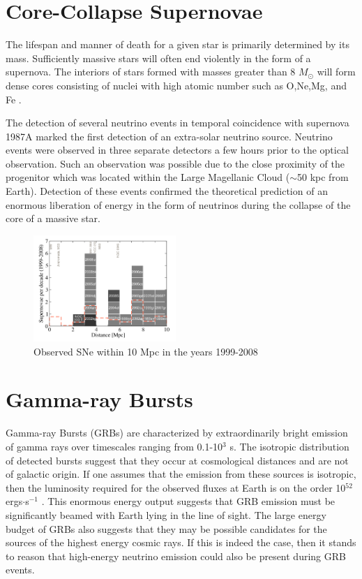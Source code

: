 \documentclass{gatech-thesis}
\begin{document}
\section{Core-Collapse Supernovae}
The lifespan and manner of death for a given star is primarily determined by its mass. Sufficiently massive stars will often end violently in the form of a supernova. The interiors of stars formed with masses greater than 8 $M_{\odot}$ will form dense cores consisting of nuclei with high atomic number such as O,Ne,Mg, and Fe \cite{2003astro.ph..1006H}.

The detection of several neutrino events in temporal coincidence with supernova 1987A marked the first detection of an extra-solar neutrino source. Neutrino events were observed in three separate detectors a few hours prior to the optical observation. Such an observation was possible due to the close proximity of the progenitor which was located within the Large Magellanic Cloud ($\sim$50 kpc from Earth). Detection of these events confirmed the theoretical prediction of an enormous liberation of energy in the form of neutrinos during the collapse of the core of a massive star.


\begin{figure}
  \begin{center}
    \includegraphics[width=0.48\textwidth,keepaspectratio]{NearbySNCatalogue.png}
  \end{center}
  \caption{Observed SNe within 10 Mpc in the years 1999-2008 \cite{2011PhRvD..83l3008K}}
  \label{fig:local_ccsne}
\end{figure}


\section{Gamma-ray Bursts}
Gamma-ray Bursts (GRBs) are characterized by extraordinarily bright emission of gamma rays over timescales ranging from 0.1-10$^3$ s. The isotropic distribution of detected bursts suggest that they occur at cosmological distances and are not of galactic origin. If one assumes that the emission from these sources is isotropic, then the luminosity required for the observed fluxes at Earth is on the order 10$^{52}$ ergs$\cdot$s$^{-1}$ \cite{2004RvMP...76.1143P}. This enormous energy output suggests that GRB emission must be significantly beamed with Earth lying in the line of sight. The large energy budget of GRBs also suggests that they may be possible candidates for the sources of the highest energy cosmic rays. If this is indeed the case, then it stands to reason that high-energy neutrino emission could also be present during GRB events.
\end{document}
